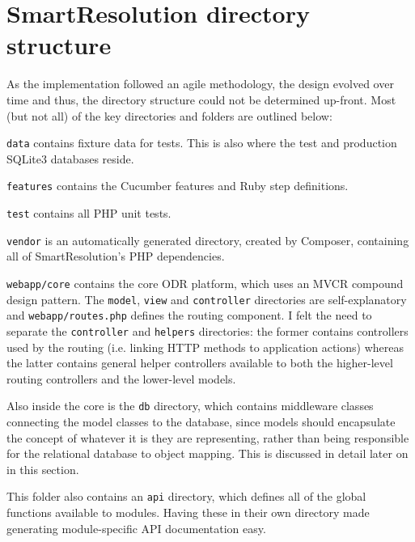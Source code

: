 \section{SmartResolution directory structure}

As the implementation followed an agile methodology, the design evolved over time and thus, the directory structure could not be determined up-front. Most (but not all) of the key directories and folders are outlined below:

\begin{minipage}{\textwidth}
\end{minipage}

\lstinline{data} contains fixture data for tests. This is also where the test and production SQLite3 databases reside.

\lstinline{features} contains the Cucumber features and Ruby step definitions.

\lstinline{test} contains all PHP unit tests.

\lstinline{vendor} is an automatically generated directory, created by Composer, containing all of SmartResolution's PHP dependencies.

\lstinline{webapp/core} contains the core ODR platform, which uses an MVCR compound design pattern. The \lstinline{model}, \lstinline{view} and \lstinline{controller} directories are self-explanatory and \lstinline{webapp/routes.php} defines the routing component. I felt the need to separate the \lstinline{controller} and \lstinline{helpers} directories: the former contains controllers used by the routing (i.e. linking HTTP methods to application actions) whereas the latter contains general helper controllers available to both the higher-level routing controllers and the lower-level models.

Also inside the core is the \lstinline{db} directory, which contains middleware classes connecting the model classes to the database, since models should encapsulate the concept of whatever it is they are representing, rather than being responsible for the relational database to object mapping. This is discussed in detail later on in this section.

This folder also contains an \lstinline{api} directory, which defines all of the global functions available to modules. Having these in their own directory made generating module-specific API documentation easy.

